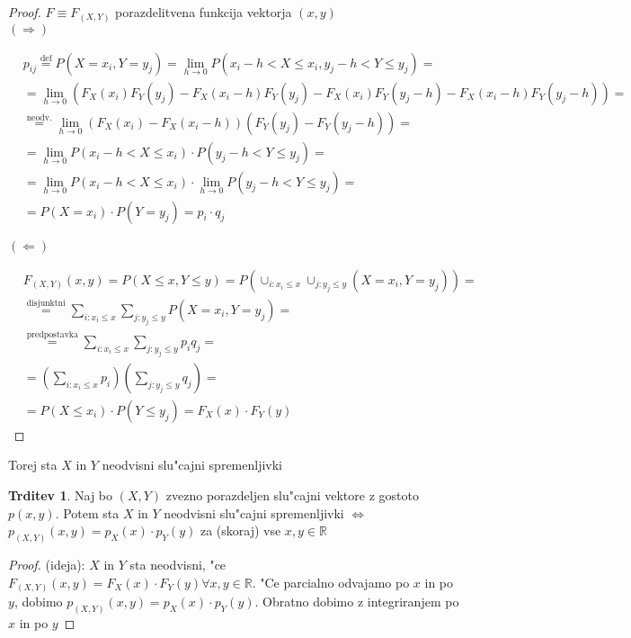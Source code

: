 \documentclass[a4paper,12pt]{article}
\theoremstyle{definition}
\newtheorem{claim}[counter]{Trditev}
\theoremstyle{remark}
\newcommand{\R}{\mathbb{R}}
\begin{document}
\begin{proof}
    $F \equiv F_{(X,Y)}$ porazdelitvena funkcija vektorja $(x,y)$ \\
    $(\Rightarrow)$

    \begin{align*}
        &p_{ij} \stackrel{\text{def}}{=} P(X = x_i, Y = y_j) =
            \lim_{h \to 0} P(x_i - h < X \leq x_i, y_j - h < Y \leq y_j) = \\
        &= \lim_{h \to 0} (F_X(x_i) F_Y(y_j) - F_X(x_i - h) F_Y(y_j) -
            F_X(x_i) F_Y(y_j - h) - F_X(x_i - h) F_Y(y_j - h)) = \\
        &\stackrel{\text{neodv.}}{=} \lim_{h \to 0} (F_X(x_i) - F_X(x_i - h)) (F_Y(y_j) - F_Y(y_j - h)) = \\
        &= \lim_{h \to 0} P(x_i - h < X \leq x_i) \cdot P(y_j - h < Y \leq y_j) = \\
        &= \lim_{h \to 0} P(x_i - h < X \leq x_i) \cdot \lim_{h \to 0} P(y_j - h < Y \leq y_j) = \\
        &= P(X = x_i) \cdot P(Y = y_j) = p_i \cdot q_j
    \end{align*}

    $(\Leftarrow)$

    \begin{align*}
        &F_{(X,Y)}(x,y) = P(X \leq x, Y \leq y) = P(\cup_{i: x_i \leq x} \cup_{j: y_j \leq y} (X = x_i, Y = y_j)) = \\
        &\stackrel{\text{disjunktni}}{=} \sum_{i: x_i \leq x} \sum_{j: y_j \leq y} P(X = x_i, Y = y_j) = \\
        &\stackrel{\text{predpostavka}}{=} \sum_{i: x_i \leq x} \sum_{j: y_j \leq y} p_i q_j = \\
        &= (\sum_{i: x_i \leq x} p_i) (\sum_{j: y_j \leq y} q_j) = \\
        &= P(X \leq x_i) \cdot P(Y \leq y_j) = F_X(x) \cdot F_Y(y)
    \end{align*}
\end{proof}

Torej sta $X$ in $Y$ neodvisni slu"cajni spremenljivki

\begin{claim}
    Naj bo $(X,Y)$ zvezno porazdeljen slu"cajni vektore z gostoto $p(x,y)$. Potem sta $X$ in $Y$ neodvisni
    slu"cajni spremenljivki $\iff$ $p_{(X,Y)}(x,y) = p_X(x) \cdot p_Y(y)$ za (skoraj) vse $x,y \in \R$
\end{claim}

\begin{proof}
    (ideja): $X$ in $Y$ sta neodvisni, "ce $F_{(X,Y)}(x,y) = F_X(x) \cdot F_Y(y) \forall x, y \in \R$. "Ce parcialno
    odvajamo po $x$ in po $y$, dobimo $p_{(X,Y)}(x,y) = p_X(x) \cdot p_Y(y)$. Obratno dobimo z integriranjem po
    $x$ in po $y$
\end{proof}
\end{document}
